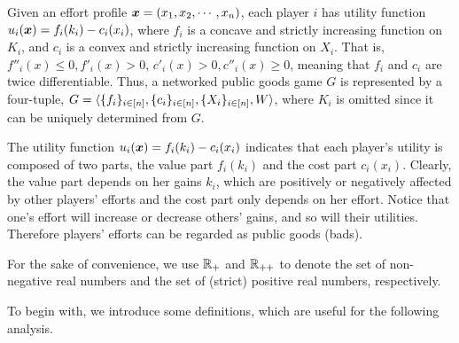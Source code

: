 Given an effort profile ${{\bm{x}}}=(x_1,x_2,\cdots,x_n)$, each player $i$ has utility function $u_i({\bm{x}}) = f_i(k_i) - c_i(x_i)$, where $f_i$ is a concave and strictly increasing function on $K_i$, and $c_i$ is a convex and strictly increasing function on $X_i$. That is, $f''_i(x)\le 0, f'_i(x)>0$, $c'_i(x) >0, c''_i(x) \ge 0$, meaning that $f_i$ and $c_i$ are twice differentiable. 
Thus, a networked public goods game $G$ is represented by a four-tuple, $G = \langle \{f_i\}_{i\in[n]}, \{c_i\}_{i\in[n]}, \{X_i\}_{i\in[n]}, W \rangle$, where $K_i$ is omitted since it can be uniquely determined from $G$.


The utility function  $u_i({\bm{x}}) = f_i(k_i) - c_i(x_i)$ indicates that each player's utility is composed of two parts, the value part $f_i(k_i)$ and the cost part $c_i(x_i)$. Clearly, the value part depends on her gains $k_i$, which are positively or negatively affected by other players' efforts and the cost part only depends on her effort. Notice that one's effort will increase or decrease others' gains, and so will their utilities. Therefore players' efforts can be regarded as public goods (bads).

For the sake of convenience, we use $\mathbb{R}_+$ and  $\mathbb{R}_{++}$ to denote the set of non-negative real numbers and the set of (strict) positive real numbers, respectively.

To begin with, we introduce some definitions, which are useful for the following analysis.





